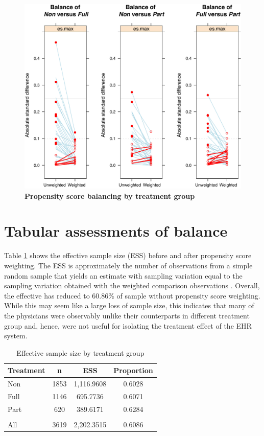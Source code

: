 \documentclass[12pt]{report}
\begin{document}
\begin{figure}[!htb]
\begin{center}
\includegraphics[width=\textwidth]{psdiag4.pdf}
\caption{{\bf Propensity score balancing by treatment group}}
\label{fig:diag4}
\end{center}
\end{figure}

\section{Tabular assessments of balance}
Table \ref{tab:ess} shows the effective sample size (ESS) before and after propensity score weighting. The ESS is approximately the number of observations from a simple random sample that yields an estimate with sampling variation equal to the sampling variation obtained with the weighted comparison observations \citep{twangvignettes}.  Overall, the effective has reduced to 60.86\% of sample without propensity score weighting. While this may seem like a large loss of sample size, this indicates that many of the physicians were observably unlike their counterparts in different treatment group and, hence, were not useful for isolating the treatment effect of the EHR system.

\begin{table}[h]
\caption{Effective sample size by treatment group}
\centering
\footnotesize
\label{tab:ess}
\begin{tabular}{lccc}
\hline \hline
Treatment & n    & ESS        & Proportion \\ \hline
Non       & 1853 & 1,116.9608 & 0.6028     \\
Full      & 1146 & 695.7736   & 0.6071     \\
Part      & 620  & 389.6171   & 0.6284     \\
          &     &               &           \\
All       & 3619 & 2,202.3515 & 0.6086     \\ \hline \hline 
\end{tabular}
\end{table}
\end{document}
